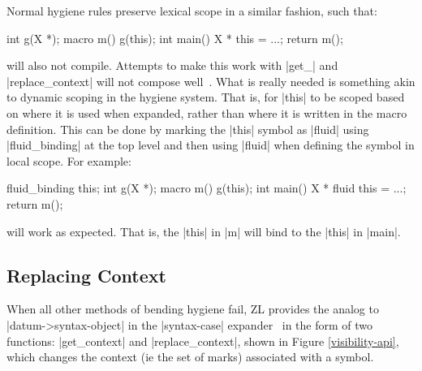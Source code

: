 Normal hygiene rules preserve lexical scope in a similar fashion, such that:
\begin{code}
int g(X *);
macro m() {g(this);}
int main() {X * this = ...; return m();}
\end{code}
will also not compile.  Attempts to make this work with |get_| and
|replace_context| will not compose well~\cite{syn-parm}.  What
is really needed is something akin to dynamic scoping in the hygiene
system.  That is, for |this| to be scoped based on where it is used
when expanded, rather than where it is written in the macro
definition.  This can be done by marking the |this| symbol as |fluid|
using |fluid_binding| at the top level and then using |fluid| when
defining the symbol in local scope.  For example:
\begin{code}
fluid_binding this;
int g(X *);
macro m() {g(this);}
int main() {X * fluid this = ...; return m();}
\end{code}
will work as expected.  That is, the |this| in |m| will bind to the
|this| in |main|. 




\subsection{Replacing Context}
\label{replace_context}

When all other methods of bending hygiene fail, ZL provides the analog
to |datum->syntax-object| in the |syntax-case|
expander~\cite{syntax-case} in the form of two functions:
|get_context| and |replace_context|, shown in Figure
\ref{visibility-api}, which changes the context (ie the set of marks)
associated with a symbol.

